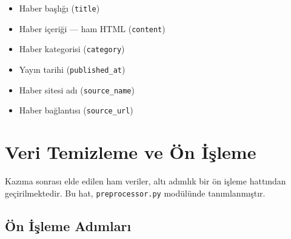 \documentclass[conference]{IEEEtran}
\begin{document}
\begin{itemize}[leftmargin=*]
    \item Haber başlığı (\texttt{title})
    \item Haber içeriği — ham HTML (\texttt{content})
    \item Haber kategorisi (\texttt{category})
    \item Yayın tarihi (\texttt{published\_at})
    \item Haber sitesi adı (\texttt{source\_name})
    \item Haber bağlantısı (\texttt{source\_url})
\end{itemize}

\section{Veri Temizleme ve Ön İşleme}
\label{sec:preprocessing}

Kazıma sonrası elde edilen ham veriler, altı adımlık bir ön işleme hattından geçirilmektedir. Bu hat, \texttt{preprocessor.py} modülünde tanımlanmıştır.

\subsection{Ön İşleme Adımları}
\end{document}
